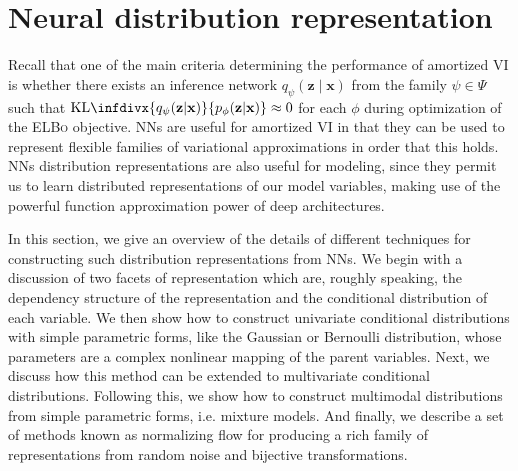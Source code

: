 \section{Neural distribution representation}
Recall that one of the main criteria determining the performance of amortized VI is whether there exists an inference network $q_\psi(\mathbf{z}\mid\mathbf{x})$ from the family $\psi\in\Psi$ such that $\text{KL}\infdivx{q_\psi(\mathbf{z}|\mathbf{x})}{p_\phi(\mathbf{z}|\mathbf{x})}\approx0$ for each $\phi$ during optimization of the {\scshape ELBo} objective. NNs are useful for amortized VI in that they can be used to represent flexible families of variational approximations in order that this holds. NNs distribution representations are also useful for modeling, since they permit us to learn distributed representations of our model variables, making use of the powerful function approximation power of deep architectures.

In this section, we give an overview of the details of different techniques for constructing such distribution representations from NNs. We begin with a discussion of two facets of representation which are, roughly speaking, the dependency structure of the representation and the conditional distribution of each variable. We then show how to construct univariate conditional distributions with simple parametric forms, like the Gaussian or Bernoulli distribution, whose parameters are a complex nonlinear mapping of the parent variables. Next, we discuss how this method can be extended to multivariate conditional distributions. Following this, we show how to construct multimodal distributions from simple parametric forms, i.e. mixture models. And finally, we describe a set of methods known as normalizing flow for producing a rich family of representations from random noise and bijective transformations.



